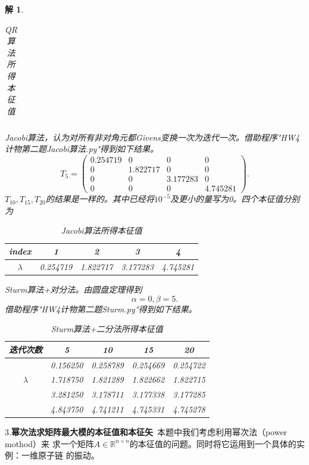 \documentclass[10pt]{ctexart}
\newtheorem*{solution}{解}
\begin{document}
\begin{solution}
\begin{table}[H]
\begin{tabular}{ccccc}
            \bottomrule
        \end{tabular}
        \caption{QR算法所得本征值}
    \end{table}
    Jacobi算法，认为对所有非对角元都Givens变换一次为迭代一次。借助程序"HW4计物第二题Jacobi算法.py"得到如下结果。
    $$T_5=
    \begin{pmatrix}
        0.254719 & 0 & 0 & 0\\
        0 & 1.822717 & 0 & 0\\
        0 & 0 & 3.177283 & 0\\
        0 & 0 & 0 & 4.745281
    \end{pmatrix}.$$
    $T_{10},T_{15},T_{20}$的结果是一样的。其中已经将$10^{-5}$及更小的量写为0。四个本征值分别为
    \begin{table}[H]
        \centering
        \begin{tabular}{ccccc}
            \toprule
            index & 1 & 2 & 3 & 4 \\
            \midrule
            $\lambda$ & 0.254719 & 1.822717 & 3.177283 & 4.745281\\
            \bottomrule
        \end{tabular}
        \caption{Jacobi算法所得本征值}
    \end{table}
    Sturm算法+对分法。由圆盘定理得到
    $$\alpha=0,\beta=5.$$
    借助程序"HW4计物第二题Sturm.py"得到如下结果。
    \begin{table}[H]
        \centering
        \begin{tabular}{ccccc}
            \toprule
            迭代次数 & 5 & 10 & 15 & 20\\
            \midrule
            & 0.156250 & 0.258789 & 0.254669 & 0.254722\\
            $\lambda$ & 1.718750 & 1.821289 & 1.822662 & 1.822715\\
            & 3.281250 & 3.178711 & 3.177338 & 3.177285\\
            & 4.843750 & 4.741211 & 4.745331 & 4.745278\\
            \bottomrule
        \end{tabular}
        \caption{Sturm算法+二分法所得本征值}
    \end{table}
\end{solution}
3.\textbf{幂次法求矩阵最大模的本征值和本征矢}\ 本题中我们考虑利用幂次法（power mothod）来
求一个矩阵$A\in\mathbb{R}^{n\times n}$的本征值的问题。同时将它运用到一个具体的实例：一维原子链
的振动。
\end{document}
